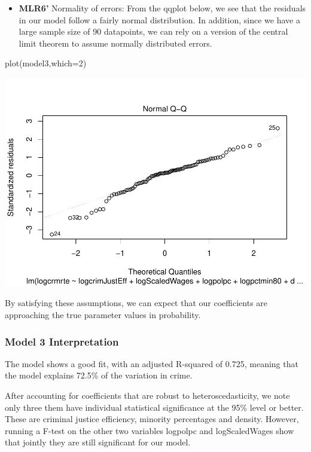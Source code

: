 \documentclass[]{article}
\newenvironment{Shaded}{}{}
\newcommand{\DataTypeTok}[1]{#1}
\newcommand{\DecValTok}[1]{#1}
\newcommand{\KeywordTok}[1]{\textcolor[rgb]{0.00,0.00,1.00}{#1}}
\newcommand{\NormalTok}[1]{#1}
\providecommand{\tightlist}{%
  \setlength{\itemsep}{0pt}\setlength{\parskip}{0pt}}
\begin{document}
\begin{itemize}
\tightlist
\item
  \textbf{MLR6'} Normality of errors: From the qqplot below, we see that
  the residuals in our model follow a fairly normal distribution. In
  addition, since we have a large sample size of 90 datapoints, we can
  rely on a version of the central limit theorem to assume normally
  distributed errors.
\end{itemize}

\begin{Shaded}
\begin{Highlighting}[]
\KeywordTok{plot}\NormalTok{(model3,}\DataTypeTok{which=}\DecValTok{2}\NormalTok{)}
\end{Highlighting}
\end{Shaded}

\includegraphics{Bagnard_Gaustad_Hartman_Leung_Lab_3_files/figure-latex/unnamed-chunk-87-1.pdf}

By satisfying these assumptions, we can expect that our coefficients are
approaching the true parameter values in probability.

\hypertarget{model-3-interpretation}{%
\subsubsection{Model 3 Interpretation}\label{model-3-interpretation}}

The model shows a good fit, with an adjusted R-squared of 0.725, meaning
that the model explains 72.5\% of the variation in crime.

After accounting for coefficients that are robust to heteroscedasticity,
we note only three them have individual statistical significance at the
95\% level or better. These are criminal justice efficiency, minority
percentages and density. However, running a F-test on the other two
variables logpolpc and logScaledWages show that jointly they are still
significant for our model.
\end{document}
